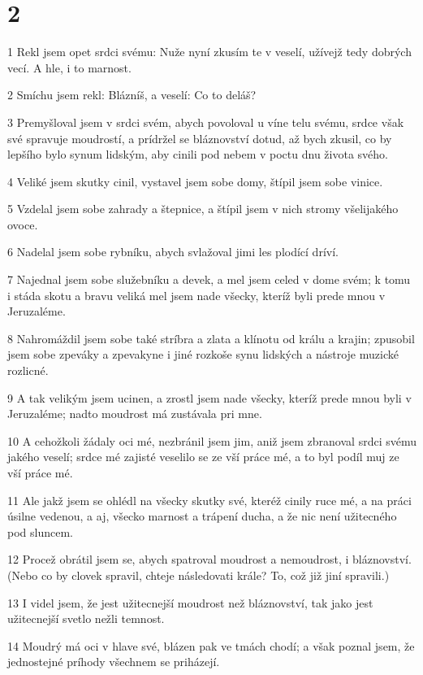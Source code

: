 \chapter{2}

\par 1 Rekl jsem opet srdci svému: Nuže nyní zkusím te v veselí, užívejž tedy dobrých vecí. A hle, i to marnost.
\par 2 Smíchu jsem rekl: Blázníš, a veselí: Co to deláš?
\par 3 Premyšloval jsem v srdci svém, abych povoloval u víne telu svému, srdce však své spravuje moudrostí, a prídržel se bláznovství dotud, až bych zkusil, co by lepšího bylo synum lidským, aby cinili pod nebem v poctu dnu života svého.
\par 4 Veliké jsem skutky cinil, vystavel jsem sobe domy, štípil jsem sobe vinice.
\par 5 Vzdelal jsem sobe zahrady a štepnice, a štípil jsem v nich stromy všelijakého ovoce.
\par 6 Nadelal jsem sobe rybníku, abych svlažoval jimi les plodící dríví.
\par 7 Najednal jsem sobe služebníku a devek, a mel jsem celed v dome svém; k tomu i stáda skotu a bravu veliká mel jsem nade všecky, kteríž byli prede mnou v Jeruzaléme.
\par 8 Nahromáždil jsem sobe také stríbra a zlata a klínotu od králu a krajin; zpusobil jsem sobe zpeváky a zpevakyne i jiné rozkoše synu lidských a nástroje muzické rozlicné.
\par 9 A tak velikým jsem ucinen, a zrostl jsem nade všecky, kteríž prede mnou byli v Jeruzaléme; nadto moudrost má zustávala pri mne.
\par 10 A cehožkoli žádaly oci mé, nezbránil jsem jim, aniž jsem zbranoval srdci svému jakého veselí; srdce mé zajisté veselilo se ze vší práce mé, a to byl podíl muj ze vší práce mé.
\par 11 Ale jakž jsem se ohlédl na všecky skutky své, kteréž cinily ruce mé, a na práci úsilne vedenou, a aj, všecko marnost a trápení ducha, a že nic není užitecného pod sluncem.
\par 12 Procež obrátil jsem se, abych spatroval moudrost a nemoudrost, i bláznovství. (Nebo co by clovek spravil, chteje následovati krále? To, což již jiní spravili.)
\par 13 I videl jsem, že jest užitecnejší moudrost než bláznovství, tak jako jest užitecnejší svetlo nežli temnost.
\par 14 Moudrý má oci v hlave své, blázen pak ve tmách chodí; a však poznal jsem, že jednostejné príhody všechnem se priházejí.
